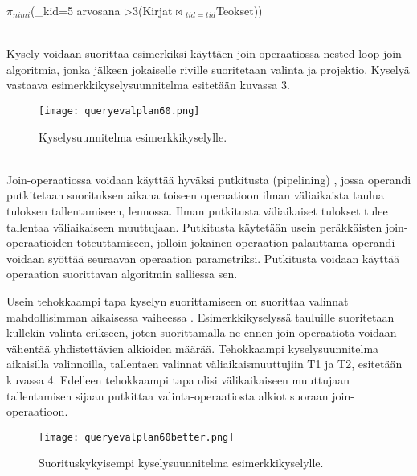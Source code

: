 \documentclass[finnish]{tktltiki2}
\theoremstyle{definition}
\theoremstyle{remark}
\begin{document}
\begin{frame}

$\pi$$_{nimi}$(\sigma_{kid=5 \wedge arvosana \textgreater 3}(Kirjat$\Join$$ _{tid=tid}$Teokset))
\end{frame}
\\\newline
Kysely voidaan suorittaa esimerkiksi käyttäen join-operaatiossa nested loop join-algoritmia, jonka jälkeen jokaiselle riville suoritetaan 
valinta ja projektio. Kyselyä vastaava esimerkkikyselysuunnitelma esitetään kuvassa 3.

\begin{figure}[!h] 
  \caption{Kyselysuunnitelma esimerkkikyselylle.}
  \centering
    \texttt{[image: queryevalplan60.png]}
\end{figure}
\\\newline
Join-operaatiossa voidaan käyttää hyväksi putkitusta (pipelining) \cite{dalvi2001pipelining}, jossa operandi putkitetaan suorituksen aikana toiseen operaatioon ilman väliaikaista taulua tuloksen tallentamiseen, lennossa. Ilman putkitusta väliaikaiset tulokset tulee tallentaa väliaikaiseen muuttujaan. Putkitusta käytetään usein peräkkäisten join-operaatioiden toteuttamiseen, jolloin jokainen operaation palauttama operandi voidaan syöttää seuraavan operaation parametriksi. Putkitusta voidaan käyttää operaation suorittavan algoritmin salliessa sen.

Usein tehokkaampi tapa kyselyn suorittamiseen on suorittaa valinnat mahdollisimman aikaisessa vaiheessa \cite{ramakrishnan2003database}. Esimerkkikyselyssä tauluille suoritetaan kullekin valinta erikseen, joten suorittamalla ne ennen join-operaatiota voidaan vähentää yhdistettävien alkioiden määrää. Tehokkaampi kyselysuunnitelma aikaisilla valinnoilla, tallentaen valinnat väliaikaismuuttujiin T1 ja T2, esitetään kuvassa 4. Edelleen tehokkaampi tapa olisi välikaikaiseen muuttujaan tallentamisen sijaan putkittaa valinta-operaatiosta alkiot suoraan join-operaatioon.

 \begin{figure}[!h] 
  \caption{Suorituskykyisempi kyselysuunnitelma esimerkkikyselylle.}
  \centering
    \texttt{[image: queryevalplan60better.png]}
\end{figure}
\\\newline
%
\end{document}
